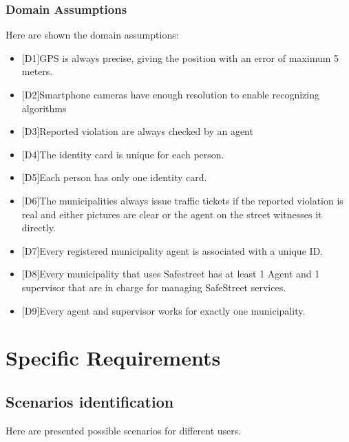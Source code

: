 \documentclass[a4paper]{report}
\begin{document}
\subsection{Domain Assumptions}
Here are shown the domain assumptions:
\begin{itemize}
\item{[D1]}GPS is always precise, giving the position with an error of maximum 5 meters.
\item{[D2]}Smartphone cameras have enough resolution to enable recognizing algorithms
\item{[D3]}Reported violation are always checked by an agent 
\item{[D4]}The identity card is unique for each person.
\item{[D5]}Each person has only one identity card.
\item{[D6]}The municipalities always issue traffic tickets if the reported violation is real and either pictures are clear or the agent on the street witnesses it directly.
\item{[D7]}Every registered municipality agent is associated with a unique ID.
\item{[D8]}Every municipality that uses Safestreet has at least 1 Agent and 1 supervisor that are in charge for managing SafeStreet services.
\item{[D9]}Every agent and supervisor works for exactly one municipality.
\end{itemize}

\chapter{Specific Requirements}
\lipsum[1]
\section{Scenarios identification} 
Here are presented possible scenarios for different users.\\ \\
\end{document}
